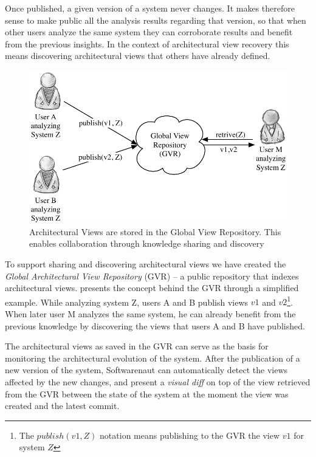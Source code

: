 \documentclass[preprint,12pt]{elsarticle}
\begin{document}
Once published, a given version of a system never changes. It makes therefore sense to make public all the analysis results regarding that version, so that when other users analyze the same system they can corroborate results and benefit from the previous insights. In the context of architectural view recovery this means discovering architectural views that others have already defined. 

\begin{figure}[ht]
\begin{center}
\includegraphics[width=0.7\linewidth]{images/CollaborationConcept}
\caption{Architectural Views are stored in the Global View Repository. This enables collaboration through knowledge sharing and discovery}
\end{center}
\end{figure}


To support sharing and discovering architectural views we have created the {\em Global Architectural View Repository} (GVR) -- a public repository that indexes architectural views.  presents the concept behind the GVR through a simplified example. While analyzing system Z, users A and B publish views $v1$ and $v2$\footnote{The $publish(v1,Z)$ notation means publishing to the GVR the view $v1$ for system $Z$}. When later user M analyzes the same system, he can already benefit from the previous knowledge by discovering the views that users A and B have published. 


The architectural views as saved in the GVR can serve as the basis for monitoring the architectural evolution of the system. After the publication of a new version of the system, Softwarenaut can automatically detect the views affected by the new changes, and present a {\em visual diff} on top of the view retrieved from the GVR between the state of the system at the moment the view was created and the latest commit.
\end{document}
